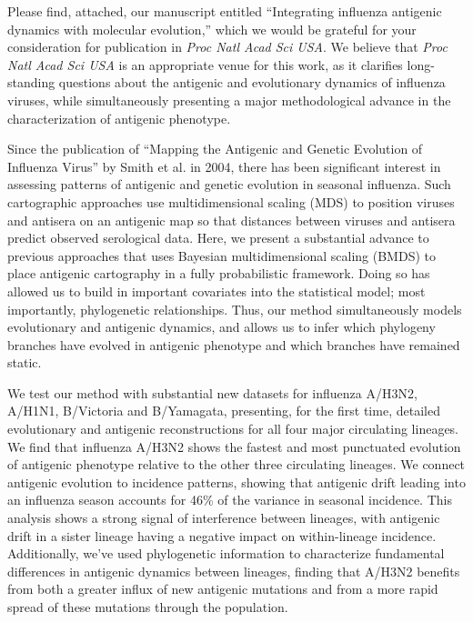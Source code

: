 \documentclass[stdletter,letterpaper,addrfromright,orderfromdateto,dateleft,11pt,noaddrto,sigleft]{newlfm}
\begin{document}
\begin{newlfm}

Please find, attached, our manuscript entitled ``Integrating influenza antigenic dynamics with molecular evolution,'' which we would be grateful for your consideration for publication in \textit{Proc Natl Acad Sci USA}.  
We believe that \textit{Proc Natl Acad Sci USA} is an appropriate venue for this work, as it clarifies long-standing questions about the antigenic and evolutionary dynamics of influenza viruses, while simultaneously presenting a major methodological advance in the characterization of antigenic phenotype.

Since the publication of ``Mapping the Antigenic and Genetic Evolution of Influenza Virus'' by Smith et al. in 2004, there has been significant interest in assessing patterns of antigenic and genetic evolution in seasonal influenza.
Such cartographic approaches use multidimensional scaling (MDS) to position viruses and antisera on an antigenic map so that distances between viruses and antisera predict observed serological data.
Here, we present a substantial advance to previous approaches that uses Bayesian multidimensional scaling (BMDS) to place antigenic cartography in a fully probabilistic framework.
Doing so has allowed us to build in important covariates into the statistical model; most importantly, phylogenetic relationships.
Thus, our method simultaneously models evolutionary and antigenic dynamics, and allows us to infer which phylogeny branches have evolved in antigenic phenotype and which branches have remained static.

We test our method with substantial new datasets for influenza A/H3N2, A/H1N1, B/Victoria and B/Yamagata, presenting, for the first time, detailed evolutionary and antigenic reconstructions for all four major circulating lineages.
We find that influenza A/H3N2 shows the fastest and most punctuated evolution of antigenic phenotype relative to the other three circulating lineages.
We connect antigenic evolution to incidence patterns, showing that antigenic drift leading into an influenza season accounts for 46\% of the variance in seasonal incidence.
This analysis shows a strong signal of interference between lineages, with antigenic drift in a sister lineage having a negative impact on within-lineage incidence.
Additionally, we've used phylogenetic information to characterize fundamental differences in antigenic dynamics between lineages, finding that A/H3N2 benefits from both a greater influx of new antigenic mutations and from a more rapid spread of these mutations through the population.


\end{newlfm}
\end{document}
